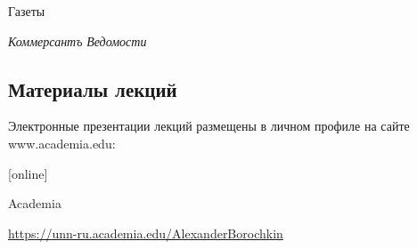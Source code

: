\documentclass[_Venture_p1.tex]{subfiles}
\begin{document}
\begin{frame}{Газеты}
    
  \begin{thebibliography}{10}
  
  \beamertemplatearticlebibitems
  \bibitem{}
  	{\em Коммерсантъ}
  \bibitem{}
  	{\em Ведомости}
  \end{thebibliography}
\end{frame}

\subsection*{Материалы лекций}
\begin{frame}
Электронные презентации лекций размещены в личном профиле на сайте www.academia.edu:
  \begin{thebibliography}{10}
  
  [online]

  Academia
    
    \footnotesize{\url{https://unn-ru.academia.edu/AlexanderBorochkin}}
  \end{thebibliography}
\end{frame}
\end{document}
